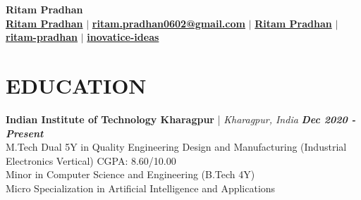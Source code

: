 \documentclass[a4paper,9pt]{extarticle}
\begin{document}
\pagestyle{fancy}
\renewcommand{\headrulewidth}{0pt}
\fancyhead{}
\thispagestyle{empty} %

\begin{center}
    \vspace{-0.8cm}
    \textbf{\huge Ritam Pradhan} \\ \vspace{2pt}
    \faGlobe
    \textbf{\href{https://ritam-pradhan.me}{Ritam Pradhan}} $\mid$
    \textbf{\href{mailto:ritam.pradhan2002@gmail.com}{ritam.pradhan0602@gmail.com}} $\mid$
    \faGraduationCap
    \textbf{\href{https://scholar.google.com/citations?user=2rvQymgAAAAJ&hl=en}{Ritam Pradhan}} 
    $\mid$
    \textbf{\href{https://www.linkedin.com/in/ritam-pradhan/}{ritam-pradhan}} 
    $\mid$
    \textbf{\href{https://github.com/inovatice-ideas}{inovatice-ideas}}
\end{center}

\section*{EDUCATION}
\vspace{-0.2cm}
\noindent
\textbf{Indian Institute of Technology Kharagpur} | \textit{Kharagpur, India} \hfill \textbf{\textit{Dec 2020 - Present}}\\ %
M.Tech Dual 5Y in Quality Engineering Design and Manufacturing (Industrial Electronics Vertical) \hfill CGPA: 8.60/10.00 \\ %
Minor in Computer Science and Engineering (B.Tech 4Y) \\
Micro Specialization in Artificial Intelligence and Applications \\ 
\vspace{-0.5cm}

\end{document}
